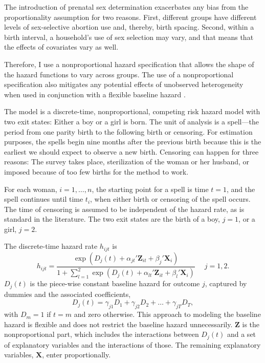 \documentclass[12pt,letterpaper]{article}
\begin{document}
The introduction of prenatal sex determination exacerbates any bias from
the proportionality assumption for two reasons. 
First, different groups have different levels of sex-selective abortion use and, thereby, 
birth spacing. 
Second, within a birth interval, a household's use of sex selection may vary, and that
means that the effects of covariates vary as well.

Therefore, I use a nonproportional hazard specification that allows the shape of the 
hazard functions to vary across groups.
The use of a nonproportional specification also mitigates any potential effects 
of unobserved heterogeneity when used in conjunction with a flexible baseline hazard 
\citep{Dolton1995}.

The model is a discrete-time, nonproportional, competing risk hazard model with two 
exit states: Either a boy or a girl is born. 
The unit of analysis is a spell---the period from one parity birth to the following 
birth or censoring. 
For estimation purposes, the spells begin nine months after the previous birth because 
this is the earliest we should expect to observe a new birth. 
Censoring can happen for three reasons: The survey takes place, sterilization of the 
woman or her husband, or imposed because of too few births for the method to work.

For each woman, $i=1,\ldots,n$, the starting point for a spell is time $t=1$, and 
the spell continues until time $t_i$, when either birth or censoring of the spell 
occurs.
The time of censoring is assumed to be independent of the hazard rate,
as is standard in the literature.
The two exit states are the birth of a boy, $j=1$, or a girl, $j=2$.

The discrete-time hazard rate $h_{ijt}$ is 
\begin{equation}
 h_{ijt} = \frac{\exp(D_j(t) + \alpha_{jt}'\mathbf{Z}_{it} + \beta_j'\mathbf{X}_{i})} 
 {1 + \sum_{l=1}^2 \exp(D_j(t) + \alpha_{lt}'\mathbf{Z}_{it} + \beta_l'\mathbf{X}_{i})} \: \: \; \; \;  j = 1,2.
 \label{eq:hazard}
\end{equation}
$D_{j}(t)$ is the piece-wise constant baseline hazard for outcome $j$, captured
by dummies and the associated coefficients,
\begin{equation}
D_j(t) = \gamma_{j1} D_1 + \gamma_{j2} D_2 + \ldots + \gamma_{jT} D_T,
\end{equation}
with $D_m = 1$ if $t=m$ and zero otherwise.
This approach to modeling the baseline hazard is flexible and does not restrict the 
baseline hazard unnecessarily.
$\mathbf{Z}$ is the nonproportional part, which includes the interactions between 
$D_j(t)$ and a set of explanatory variables and the interactions of those.
The remaining explanatory variables, $\mathbf{X}$, enter proportionally.
\end{document}
